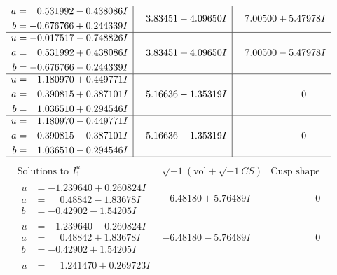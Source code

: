 \documentclass[1p]{elsarticle_modified}
\theoremstyle{definition}
\newcommand{\I}{\sqrt{-1}}
\begin{document}
$$\begin{array}{c|c|c}
\begin{aligned}
a &= \phantom{-}0.531992 - 0.438086 I \\
b &= -0.676766 + 0.244339 I\end{aligned}
 & \phantom{-}3.83451 - 4.09650 I & \phantom{-}7.00500 + 5.47978 I \\ \hline\begin{aligned}
u &= -0.017517 - 0.748826 I \\
a &= \phantom{-}0.531992 + 0.438086 I \\
b &= -0.676766 - 0.244339 I\end{aligned}
 & \phantom{-}3.83451 + 4.09650 I & \phantom{-}7.00500 - 5.47978 I \\ \hline\begin{aligned}
u &= \phantom{-}1.180970 + 0.449771 I \\
a &= \phantom{-}0.390815 + 0.387101 I \\
b &= \phantom{-}1.036510 + 0.294546 I\end{aligned}
 & \phantom{-}5.16636 - 1.35319 I & \phantom{-0.000000 } 0 \\ \hline\begin{aligned}
u &= \phantom{-}1.180970 - 0.449771 I \\
a &= \phantom{-}0.390815 - 0.387101 I \\
b &= \phantom{-}1.036510 - 0.294546 I\end{aligned}
 & \phantom{-}5.16636 + 1.35319 I & \phantom{-0.000000 } 0\\
 \hline 
 \end{array}$$\newpage$$\begin{array}{c|c|c}  
\text{Solutions to }I^u_{1}& \I (\text{vol} + \sqrt{-1}CS) & \text{Cusp shape}\\
 \hline 
\begin{aligned}
u &= -1.239640 + 0.260824 I \\
a &= \phantom{-}0.48842 - 1.83678 I \\
b &= -0.42902 - 1.54205 I\end{aligned}
 & -6.48180 + 5.76489 I & \phantom{-0.000000 } 0 \\ \hline\begin{aligned}
u &= -1.239640 - 0.260824 I \\
a &= \phantom{-}0.48842 + 1.83678 I \\
b &= -0.42902 + 1.54205 I\end{aligned}
 & -6.48180 - 5.76489 I & \phantom{-0.000000 } 0 \\ \hline\begin{aligned}
u &= \phantom{-}1.241470 + 0.269723 I \\

\end{aligned}
\end{array}$$
\end{document}
